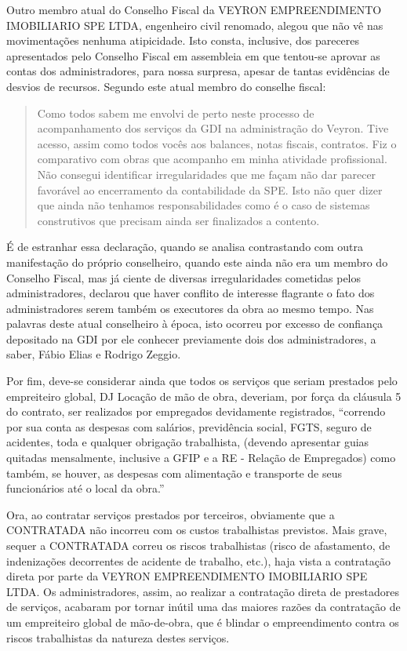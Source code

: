 \documentclass[
  letterpaper,
  DIV=11,
  numbers=noendperiod]{scrreprt}
\begin{document}
Outro membro atual do Conselho Fiscal da VEYRON EMPREENDIMENTO
IMOBILIARIO SPE LTDA, engenheiro civil renomado, alegou que não vê nas
movimentações nenhuma atipicidade. Isto consta, inclusive, dos pareceres
apresentados pelo Conselho Fiscal em assembleia em que tentou-se aprovar
as contas dos administradores, para nossa surpresa, apesar de tantas
evidências de desvios de recursos. Segundo este atual membro do conselhe
fiscal:

\begin{quote}
Como todos sabem me envolvi de perto neste processo de acompanhamento
dos serviços da GDI na administração do Veyron. Tive acesso, assim como
todos vocês aos balances, notas fiscais, contratos. Fiz o comparativo
com obras que acompanho em minha atividade profissional. Não consegui
identificar irregularidades que me façam não dar parecer favorável ao
encerramento da contabilidade da SPE. Isto não quer dizer que ainda não
tenhamos responsabilidades como é o caso de sistemas construtivos que
precisam ainda ser finalizados a contento.
\end{quote}

É de estranhar essa declaração, quando se analisa contrastando com outra
manifestação do próprio conselheiro, quando este ainda não era um membro
do Conselho Fiscal, mas já ciente de diversas irregularidades cometidas
pelos administradores, declarou que haver conflito de interesse
flagrante o fato dos administradores serem também os executores da obra
ao mesmo tempo. Nas palavras deste atual conselheiro à época, isto
ocorreu por excesso de confiança depositado na GDI por ele conhecer
previamente dois dos administradores, a saber, Fábio Elias e Rodrigo
Zeggio.

Por fim, deve-se considerar ainda que todos os serviços que seriam
prestados pelo empreiteiro global, DJ Locação de mão de obra, deveriam,
por força da cláusula 5 do contrato, ser realizados por empregados
devidamente registrados, ``correndo por sua conta as despesas com
salários, previdência social, FGTS, seguro de acidentes, toda e qualquer
obrigação trabalhista, (devendo apresentar guias quitadas mensalmente,
inclusive a GFIP e a RE - Relação de Empregados) como também, se houver,
as despesas com alimentação e transporte de seus funcionários até o
local da obra.''

Ora, ao contratar serviços prestados por terceiros, obviamente que a
CONTRATADA não incorreu com os custos trabalhistas previstos. Mais
grave, sequer a CONTRATADA correu os riscos trabalhistas (risco de
afastamento, de indenizações decorrentes de acidente de trabalho, etc.),
haja vista a contratação direta por parte da VEYRON EMPREENDIMENTO
IMOBILIARIO SPE LTDA. Os administradores, assim, ao realizar a
contratação direta de prestadores de serviços, acabaram por tornar
inútil uma das maiores razões da contratação de um empreiteiro global de
mão-de-obra, que é blindar o empreendimento contra os riscos
trabalhistas da natureza destes serviços.
\end{document}
